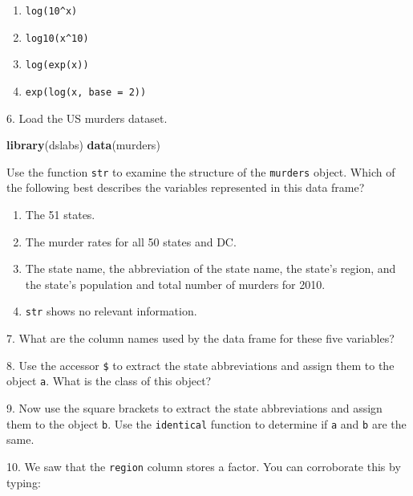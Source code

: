 \documentclass[
]{article}
\newenvironment{Shaded}{\begin{snugshade}}{\end{snugshade}}
\newcommand{\FunctionTok}[1]{\textcolor[rgb]{0.13,0.29,0.53}{\textbf{#1}}}
\newcommand{\NormalTok}[1]{#1}
\newcommand{\SpecialCharTok}[1]{\textcolor[rgb]{0.81,0.36,0.00}{\textbf{#1}}}
\providecommand{\tightlist}{%
  \setlength{\itemsep}{0pt}\setlength{\parskip}{0pt}}
\begin{document}
\begin{enumerate}
\def\labelenumi{\alph{enumi}.}
\tightlist
\item
  \texttt{log(10\^{}x)}
\item
  \texttt{log10(x\^{}10)}
\item
  \texttt{log(exp(x))}
\item
  \texttt{exp(log(x,\ base\ =\ 2))}
\end{enumerate}

6. Load the US murders dataset.

\begin{Shaded}
\begin{Highlighting}[]
\FunctionTok{library}\NormalTok{(dslabs)}
\FunctionTok{data}\NormalTok{(murders)}
\end{Highlighting}
\end{Shaded}

Use the function \texttt{str} to examine the structure of the
\texttt{murders} object. Which of the following best describes the
variables represented in this data frame?

\begin{enumerate}
\def\labelenumi{\alph{enumi}.}
\tightlist
\item
  The 51 states.
\item
  The murder rates for all 50 states and DC.
\item
  The state name, the abbreviation of the state name, the state's
  region, and the state's population and total number of murders for
  2010.
\item
  \texttt{str} shows no relevant information.
\end{enumerate}

7. What are the column names used by the data frame for these five
variables?

8. Use the accessor \texttt{\$} to extract the state abbreviations and
assign them to the object \texttt{a}. What is the class of this object?

9. Now use the square brackets to extract the state abbreviations and
assign them to the object \texttt{b}. Use the \texttt{identical}
function to determine if \texttt{a} and \texttt{b} are the same.

10. We saw that the \texttt{region} column stores a factor. You can
corroborate this by typing:

\begin{Shaded}
\end{Shaded}
\end{document}
